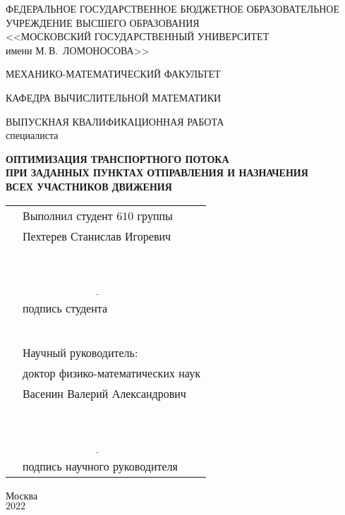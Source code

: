 \documentclass[12pt, a4paper]{article}
\begin{document}
	
\begin{center}
	ФЕДЕРАЛЬНОЕ ГОСУДАРСТВЕННОЕ БЮДЖЕТНОЕ ОБРАЗОВАТЕЛЬНОЕ\\
	УЧРЕЖДЕНИЕ ВЫСШЕГО ОБРАЗОВАНИЯ\\
	<<МОСКОВСКИЙ ГОСУДАРСТВЕННЫЙ УНИВЕРСИТЕТ\\
	имени М.\,В.~ЛОМОНОСОВА>>
\end{center}
\vspace{4pt}
\begin{center}
	МЕХАНИКО-МАТЕМАТИЧЕСКИЙ ФАКУЛЬТЕТ
\end{center}
\vspace{4pt}
\begin{center}
	КАФЕДРА ВЫЧИСЛИТЕЛЬНОЙ МАТЕМАТИКИ
\end{center}
\vspace{1cm}
\begin{center}
	ВЫПУСКНАЯ КВАЛИФИКАЦИОННАЯ РАБОТА\\
	специалиста
\end{center}

\begin{center}
	\textbf{ОПТИМИЗАЦИЯ ТРАНСПОРТНОГО ПОТОКА \\
		    ПРИ ЗАДАННЫХ ПУНКТАХ ОТПРАВЛЕНИЯ И НАЗНАЧЕНИЯ \\
		    ВСЕХ УЧАСТНИКОВ ДВИЖЕНИЯ}
\end{center}
\vspace{1cm}
\begin{center}
	\begin{tabular}{p{9cm} l}
		& Выполнил студент $610$ группы\\
		& Пехтерев Станислав Игоревич\\
		& $\phantom{C_n^k=C_n^{n-k}}$\\
		& $\underline{\phantom{\int\limits_a^bf(x)dx=F(b)-F(a)}}$\\
		& подпись студента\\
		& $\phantom{\int\limits_f(z)dz=0}$\\
		& Научный руководитель:\\
		& доктор физико-математических наук \\
		& Васенин Валерий Александрович\\
		& $\phantom{C_n^k=C_n^{n-k}}$\\
		& $\underline{\phantom{\int\limits_a^bf(x)dx=F(b)-F(a)}}$\\
		& подпись научного руководителя\\
	\end{tabular}
\end{center}
\vspace{1cm}
\begin{center}
	Москва\\
	$2022$
\end{center}
\end{document}
